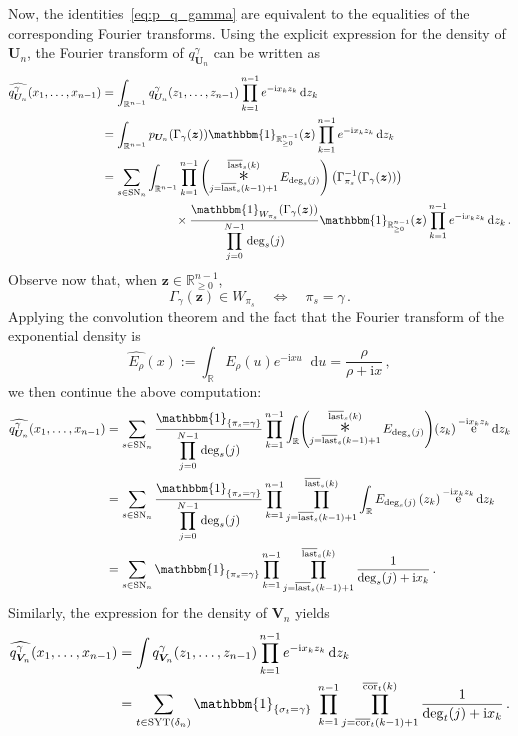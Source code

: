 \documentclass[a4paper,reqno,12pt]{amsart}
\theoremstyle{plain}
\theoremstyle{definition}
\newcommand{\R}{\mathbb{R}}
\newcommand{\syt}{\textnormal{SYT}}
\newcommand{\staircase}{\delta}
\newcommand{\sort}{\textnormal{SN}}
\newcommand{\diag}{\textnormal{cor}}
\newcommand{\diagsorted}{\overline{\diag}}
\newcommand{\fin}{\textnormal{last}}
\newcommand{\finsorted}{\overline{\fin}}
\renewcommand{\i}{\mathrm{i}}
\newcommand{\diff}{\mathop{}\!\mathrm{d}}
\newcommand{\1}{\mathbbm{1}}
\DeclareMathOperator{\e}{\mathrm{e}}
\renewcommand{\hat}{\widehat}
\begin{document}
Now, the identities~\eqref{eq:p_q_gamma} are equivalent to the equalities of the corresponding Fourier transforms.
Using the explicit expression for the density of $\bm{U}_n$, the Fourier transform of $q_{\bm{U}_n}^{\gamma}$ can be written as
\[
\begin{split}
\hat{q_{\bm{U}_n}^{\gamma}} (x_1,\ldots, x_{n-1})
&=\int_{\R^{n-1}} q_{\bm{U}_n}^{\gamma}(z_1,\ldots,z_{n-1}) \prod_{k=1}^{n-1}e^{-\i x_k z_k}\diff z_k \\
&=\int_{\R^{n-1}} p_{\bm{U}_n}(\Gamma_{\gamma}(\bm{z}))\1_{\R^{n-1}_{\geq 0}}(\bm{z}) \prod_{k=1}^{n-1}e^{-\i x_k z_k}\diff z_k \\
&=\sum_{s \in \sort_n}
\int_{\R^{n-1}}
\prod_{k=1}^{n-1}  \left(\convolutionop_{j=\finsorted_s(k-1)+1}^{\finsorted_s(k)} 
E_{\deg_s(j)}\right) \left(\Gamma^{-1}_{\pi_s}(\Gamma_{\gamma}(\bm{z}))\right) \\
&\qquad\qquad\qquad\, \times
\frac{\1_{W_{\pi_s}}(\Gamma_{\gamma}(\bm{z}))}{\displaystyle\prod_{j=0}^{N-1} \deg_s(j)} \1_{\R^{n-1}_{\geq 0}}(\bm{z}) \prod_{k=1}^{n-1}e^{-\i x_k z_k}\diff z_k \, .
\end{split}
\]
Observe now that, when $\bm{z} \in \R_{\geq 0}^{n-1}$,
\[
\Gamma_{\gamma}(\bm{z})\in W_{\pi_s}
\quad \Longleftrightarrow \quad
\pi_s = \gamma \, .
\]
Applying the convolution theorem and the fact that the Fourier transform of the exponential density is 
\[
\hat{E_\rho}(x)
:=\int_{\R} E_\rho(u)e^{-\i xu}\diff u
=\frac{\rho}{\rho+\i x} \, ,
\]
we then continue the above computation:
\[
\begin{split}
\hat{q_{\bm{U}_n}^{\gamma}} (x_1,\ldots, x_{n-1})
&=\sum_{s \in \sort_n} \frac{\1_{\{\pi_s=\gamma\}}}{\displaystyle\prod_{j=0}^{N-1} \deg_s(j)} \prod_{k=1}^{n-1}  \int_{\R} \! \left(\convolutionop_{j=\finsorted_s(k-1)+1}^{\finsorted_s(k)} 
E_{\deg_s(j)}\right)\!\left(z_k\right)  \e^{-\i x_k z_k}\diff z_k\\
&= \sum_{s \in \sort_n} \frac{\1_{\{\pi_s=\gamma\}}}{\displaystyle\prod_{j=0}^{N-1} \deg_s(j)} \prod_{k=1}^{n-1}  \prod_{j=\finsorted_s(k-1)+1}^{\finsorted_s(k)} \int_{\R}
E_{\deg_s(j)}\left(z_k\right) \e^{-\i x_kz_k}\diff z_k\\
&= \sum_{s \in \sort_n} \1_{\{\pi_s=\gamma\}} \prod_{k=1}^{n-1}  \prod_{j=\finsorted_s(k-1)+1}^{\finsorted_s(k)} \frac{1}{\deg_s(j)+\i x_k} \, .
\end{split}
\]
Similarly, the expression for the density of $\bm{V}_n$ yields
\[
\begin{split}
\hat{q_{\bm{V}_n}^{\gamma}}(x_1,\ldots,x_{n-1})
&=\int q_{\bm{V}_n}^{\gamma}(z_1,\ldots,z_{n-1})\prod_{k=1}^{n-1}e^{-\i x_k z_k}\diff z_k\\
&=\sum_{t \in \syt(\staircase_n)} \1_{\{\sigma_t=\gamma\}}\;\prod_{k=1}^{n-1}  \prod_{j=\diagsorted_t(k-1)+1}^{\diagsorted_t(k)} \frac{1}{\deg_t(j)+\i x_k} \, .
\end{split}
\]
\end{document}

